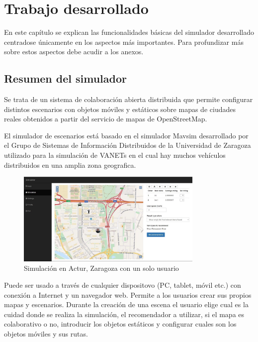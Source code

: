 \chapter{Trabajo desarrollado}
\thispagestyle{empty}


En este capítulo se explican las funcionalidades básicas del simulador desarrollado centradose únicamente en los aspectos más importantes. Para profundizar más sobre estos aspectos debe acudir a los anexos.

\section{Resumen del simulador}
\thispagestyle{empty}

Se trata de un sistema de colaboración abierta distribuida que permite configurar distintos escenarios con objetos móviles y estáticos sobre mapas de ciudades reales obtenidos a partir del servicio de mapas de OpenStreetMap. 

El simulador de escenarios está basado en el simulador Mavsim desarrollado por el Grupo de Sistemas de Información Distribuidos de la Universidad de Zaragoza utilizado para la simulación de VANETs en el cual hay muchos vehículos distribuidos en una amplia zona geografica.

\begin{figure}[H]
\centering\includegraphics[width=0.8\textwidth]{imagenes/resumen-simulador.jpg}
\caption{Simulación en Actur, Zaragoza con un solo usuario}
\label{c2_trama}
\end{figure}

Puede ser usado a través de cualquier dispositovo (PC, tablet, móvil etc.) con conexión a Internet y un navegador web. Permite a los usuarios crear sus propios mapas y escenarios. Durante la creación de una escena el usuario elige cual es la cuidad donde se realiza la simulación, el recomendador a utilizar, si el mapa es colaborativo o no, introducir los objetos estáticos y configurar cuales son los objetos móviles y sus rutas. 

